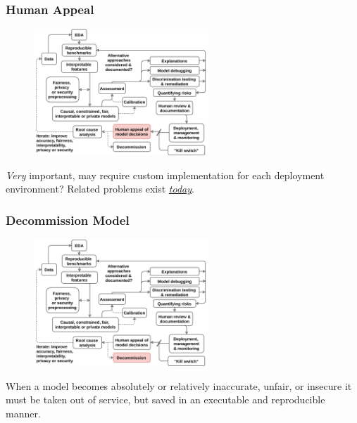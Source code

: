 \documentclass[11pt,
               aspectratio=169,
               hyperref={colorlinks}
               ]{beamer}
\begin{document}
			\begin{frame}	
			
				\frametitle{Human Appeal}		
				
				\begin{figure}[htb]
					\begin{center}
						\includegraphics[height=135pt]{../img/ha.png}
					\end{center}
				\end{figure}	
	
				\footnotesize{\textit{Very} important, may require custom implementation for each deployment environment? Related problems exist \href{https://www.nytimes.com/2017/06/13/opinion/how-computers-are-harming-criminal-justice.html}{\textit{today}}}.
	
			\end{frame}
	
			\begin{frame}	
				\frametitle{Decommission Model}		
				
				\begin{figure}[htb]
					\begin{center}
						\includegraphics[height=135pt]{../img/zde.png}
					\end{center}
				\end{figure}	
	
				\footnotesize{When a model becomes absolutely or relatively inaccurate, unfair, or insecure it must be taken out of service, but saved in an executable and reproducible manner.}
	
			\end{frame}
	
\end{document}
